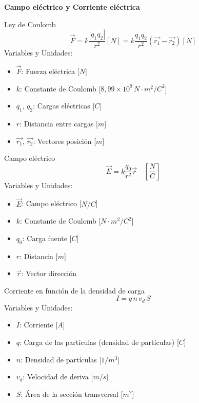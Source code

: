 \documentclass{article}
\begin{document}
\begin{center}
    \LARGE \textbf{Campo eléctrico y Corriente eléctrica}
\end{center}

\begin{multicols}{3}

\begin{teorema}{Ley de Coulomb}
    $$\vec{F} = k\frac{|q_1q_2|}{r^2}[N] = k\frac{q_1q_2}{r^2}(\vec{r_1} - \vec{r_2}) [N]$$
    Variables y Unidades:
    \begin{itemize}
        \item $\vec{F}$: Fuerza eléctrica [$N$]
        \item $k$: Constante de Coulomb [$8,99 \times 10^9 \, N\cdot m^2/C^2$]
        \item $q_1$, $q_2$: Cargas eléctricas [$C$]
        \item $r$: Distancia entre cargas [$m$]
        \item $\vec{r_1}$, $\vec{r_2}$: Vectores posición [$m$]
    \end{itemize}
\end{teorema}

\begin{teorema}{Campo eléctrico}
    $$\vec{E} = k\frac{q_0}{r^2}\vec{r}\quad [\frac{N}{C}]$$
    Variables y Unidades:
    \begin{itemize}
        \item $\vec{E}$: Campo eléctrico [$N/C$]
        \item $k$: Constante de Coulomb [$N\cdot m^2/C^2$]
        \item $q_0$: Carga fuente [$C$]
        \item $r$: Distancia [$m$]
        \item $\vec{r}$: Vector dirección
    \end{itemize}
\end{teorema}

\begin{teorema}{Corriente en función de la densidad de carga}
    $$I = q \, n \, v_d \, S$$
    Variables y Unidades:
    \begin{itemize}
        \item $I$: Corriente [$A$]
        \item $q$: Carga de las partículas (densidad de partículas) [$C$]
        \item $n$: Densidad de partículas [$1/m^3$]
        \item $v_d$: Velocidad de deriva [$m/s$]
        \item $S$: Área de la sección transversal [$m^2$]
    \end{itemize}
\end{teorema}


\end{multicols}
\end{document}
